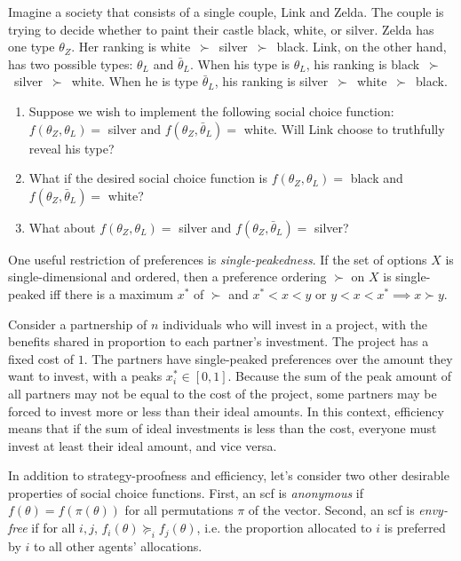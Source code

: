 \documentclass[10pt]{article}
\begin{document}
\begin{spacing}{1.0}
\begin{exercise}
  Imagine a society that consists of a single couple, Link and Zelda. The
  couple is trying to decide whether to paint their castle black, white, or
  silver. Zelda has one type $\theta_Z$. Her ranking is
  white~$\succ$~silver~$\succ$~black. Link, on the other hand, has two
  possible types: $\theta_L$ and $\bar{\theta}_L$. When his type is
  $\theta_L$, his ranking is black~$\succ$~silver~$\succ$~white. When he is
  type $\bar{\theta}_L$, his ranking is
  silver~$\succ$~white~$\succ$~black.
  \begin{enumerate}
  \item Suppose we wish to implement the following social choice function:
    $f(\theta_Z, \theta_L) =$ silver and $f(\theta_Z, \bar{\theta}_L) =$
    white. Will Link choose to truthfully reveal his type?
  \item What if the desired social choice function is
    $f(\theta_Z, \theta_L) =$ black and $f(\theta_Z,
    \bar{\theta}_L) =$ white?
  \item What about  $f(\theta_Z, \theta_L) =$ silver and $f(\theta_Z,
  \bar{\theta}_L) =$ silver?
  \end{enumerate}
\end{exercise}

\begin{exercise}[Sprumont 1991]
  One useful restriction of preferences is \emph{single-peakedness}. If the
  set of options $X$ is single-dimensional and ordered, then a preference
  ordering $\succ$ on $X$ is single-peaked iff there is a maximum $x^*$ of
  $\succ$ and $x^* < x < y$ or $y < x < x^* \implies x \succ y$.

  \hspace{1em}
  Consider a partnership of $n$ individuals who will invest in a project,
  with the benefits shared in proportion to each partner's investment. The
  project has a fixed cost of $1$. The partners have single-peaked
  preferences over the amount they want to invest, with a peaks $x_i^* \in
  [0,1]$. Because the sum of the peak amount of all partners may not be
  equal to the cost of the project, some partners may be forced to invest
  more or less than their ideal amounts. In this context, efficiency means
  that if the sum of ideal investments is less than the cost, everyone must
  invest at least their ideal amount, and vice versa.

  \hspace{1em}
  In addition to strategy-proofness and efficiency, let's consider two
  other desirable properties of social choice functions. First, an scf is
  \emph{anonymous} if $f(\theta)=f(\pi(\theta))$ for all permutations $\pi$
  of the vector. Second, an scf is \emph{envy-free} if for all $i,j$,
  $f_i(\theta) \succeq_i f_j(\theta)$, i.e. the proportion allocated to $i$
  is preferred by $i$ to all other agents' allocations.


\end{exercise}
\end{spacing}
\end{document}
